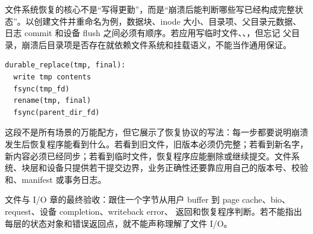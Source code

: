 文件系统恢复的核心不是“写得更勤”，而是“崩溃后能判断哪些写已经构成完整状态”。以创建文件并重命名为例，数据块、inode 大小、目录项、父目录元数据、日志 commit 和设备 flush 之间必须有顺序。若应用写临时文件、、，但忘记  父目录，崩溃后目录项是否存在就依赖文件系统和挂载语义，不能当作通用保证。

\begin{lstlisting}
durable_replace(tmp, final):
  write tmp contents
  fsync(tmp_fd)
  rename(tmp, final)
  fsync(parent_dir_fd)
\end{lstlisting}

这段不是所有场景的万能配方，但它展示了恢复协议的写法：每一步都要说明崩溃发生后恢复程序能看到什么。若看到旧文件，旧版本必须仍完整；若看到新名字，新内容必须已经同步；若看到临时文件，恢复程序应能删除或继续提交。文件系统、块层和设备只提供若干提交边界，业务正确性还要靠应用自己的版本号、校验和、manifest 或事务日志。

\begin{warningbox}
文件与 I/O 章的最终验收：跟住一个字节从用户 buffer 到 page cache、bio、request、设备 completion、writeback error、 返回和恢复程序判断。若不能指出每层的状态对象和错误返回点，就不能声称理解了文件 I/O。
\end{warningbox}
